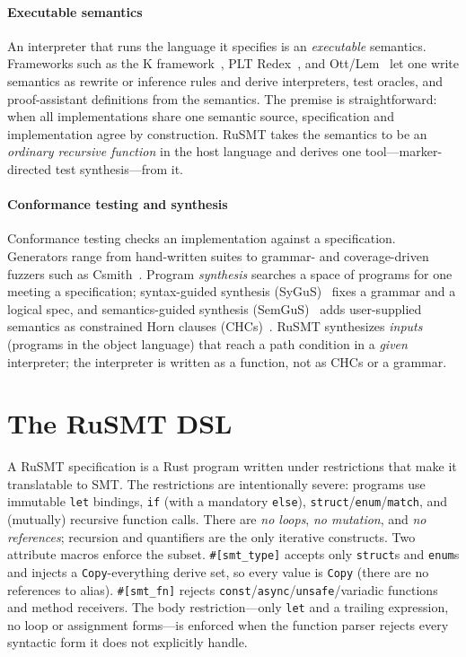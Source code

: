 \documentclass[sigplan,review,anonymous]{acmart}
\theoremstyle{definition}
\theoremstyle{remark}
\newcommand{\rusmt}{RuSMT}
\newcommand{\code}[1]{\texttt{#1}}
\begin{document}
\paragraph{Executable semantics}
An interpreter that runs the language it specifies is an \emph{executable}
semantics. Frameworks such as the K framework~\cite{rosu2010k}, PLT
Redex~\cite{felleisen2009redex}, and
Ott/Lem~\cite{sewell2007ott,mulligan2014lem} let one write semantics as rewrite
or inference rules and derive interpreters, test oracles, and proof-assistant
definitions from the semantics. The premise is straightforward: when all
implementations share one semantic source, specification and implementation agree
by construction. \rusmt{} takes the semantics to be an \emph{ordinary recursive
function} in the host language and derives one tool---marker-directed test
synthesis---from it.

\paragraph{Conformance testing and synthesis}
Conformance testing checks an implementation against a specification. Generators
range from hand-written suites to grammar- and coverage-driven fuzzers such as
Csmith~\cite{yang2011csmith}. Program \emph{synthesis} searches a space of
programs for one meeting a specification; syntax-guided synthesis
(SyGuS)~\cite{alur2013sygus} fixes a grammar and a logical spec, and
semantics-guided synthesis (SemGuS)~\cite{kim2021semgus} adds user-supplied
semantics as constrained Horn clauses (CHCs)~\cite{bjorner2015horn}. \rusmt{}
synthesizes \emph{inputs} (programs in the object language) that reach a path
condition in a \emph{given} interpreter; the interpreter is written as a
function, not as CHCs or a grammar.

\section{The \rusmt{} DSL}
\label{sec:dsl}

A \rusmt{} specification is a Rust program written under restrictions that make
it translatable to SMT. The restrictions are intentionally severe: programs use
immutable \code{let} bindings, \code{if} (with a mandatory \code{else}),
\code{struct}/\code{enum}/\code{match}, and (mutually) recursive function calls.
There are \emph{no loops}, \emph{no mutation}, and \emph{no references};
recursion and quantifiers are the only iterative constructs. Two attribute macros
enforce the subset. \code{\#[smt\_type]} accepts only \code{struct}s and
\code{enum}s and injects a \code{Copy}-everything derive set, so every value is
\code{Copy} (there are no references to alias). \code{\#[smt\_fn]} rejects
\code{const}/\code{async}/\code{unsafe}/variadic functions and method receivers.
The body restriction---only \code{let} and a trailing expression, no loop or
assignment forms---is enforced when the function parser rejects every syntactic
form it does not explicitly handle.
\end{document}
